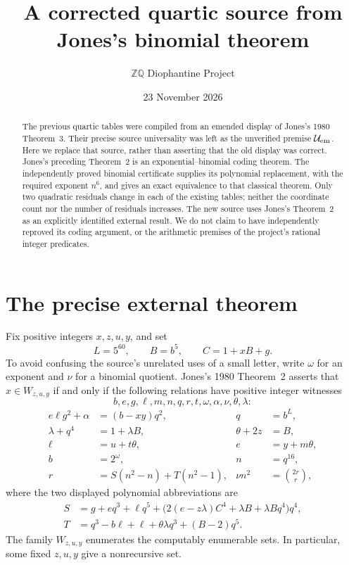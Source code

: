 \documentclass[11pt]{article}
\title{A corrected quartic source from Jones's binomial theorem}
\author{\(\mathbb Z\mathbb Q\) Diophantine Project}
\date{23 November 2026}
\begin{document}
\maketitle

\begin{abstract}
The previous quartic tables were compiled from an emended display of
Jones's 1980 Theorem~3. Their precise source universality was left as
the unverified premise \(\mathcal U_{\rm em}\). Here we replace that
source, rather than asserting that the old display was correct.
Jones's preceding Theorem~2 is an exponential--binomial coding theorem.
The independently proved binomial certificate supplies its polynomial
replacement, with the required exponent \(n^6\), and gives an exact
equivalence to that classical theorem. Only two quadratic residuals
change in each of the existing tables; neither the coordinate count nor
the number of residuals increases. The new source uses Jones's
Theorem~2 as an explicitly identified external result. We do not claim
to have independently reproved its coding argument, or the arithmetic
premises of the project's rational integer predicates.
\end{abstract}

\section{The precise external theorem}

Fix positive integers \(x,z,u,y\), and set
\[
 L=5^{60},\qquad B=b^5,\qquad C=1+xB+g.
\]
To avoid confusing the source's unrelated uses of a small letter, write
\(\omega\) for an exponent and \(\nu\) for a binomial quotient.
Jones's 1980 Theorem~2 \cite[p.~860]{Jones80} asserts that
\(x\in W_{z,u,y}\) if and only if the following relations have positive
integer witnesses
\[
 b,e,g,\ell,m,n,q,r,t,\omega,\alpha,\nu,\theta,\lambda:
\]
\begin{align}
 e\ell g^2+\alpha&=(b-xy)q^2,&q&=b^L,\label{prefix1}\\
 \lambda+q^4&=1+\lambda B,&\theta+2z&=B,\label{prefix2}\\
 \ell&=u+t\theta,&e&=y+m\theta,\label{prefix3}\\
 b&=2^\omega,&n&=q^{16},\label{exp}\\
 r&=S(n^2-n)+T(n^2-1),&\nu n^2&=\binom{2r}{r},\label{binom}
\end{align}
where the two displayed polynomial abbreviations are
\begin{align}
 S&=g+eq^3+\ell q^5+
       \bigl(2(e-z\lambda)C^4+\lambda B+\lambda Bq^4\bigr)q^4,
       \label{S}\\
 T&=q^3-b\ell+\ell+\theta\lambda q^3+(B-2)q^5.
       \label{T}
\end{align}
The family \(W_{z,u,y}\) enumerates the computably enumerable sets.
In particular, some fixed \(z,u,y\) give a nonrecursive set.
\end{document}

